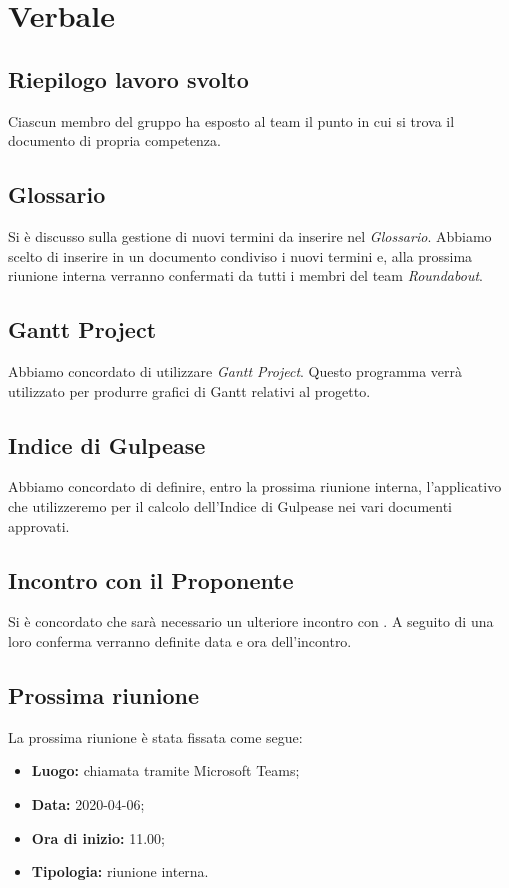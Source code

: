 \section{Verbale}
	
	\subsection{Riepilogo lavoro svolto}
		Ciascun membro del gruppo ha esposto al team il punto in cui si trova il documento di propria competenza.

	\subsection{Glossario}
		Si è discusso sulla gestione di nuovi termini da inserire nel \textit{Glossario}. Abbiamo scelto di inserire in un documento condiviso i nuovi termini e, alla prossima riunione interna verranno confermati da tutti i membri del team \textit{Roundabout}.

	\subsection{Gantt Project}
		Abbiamo concordato di utilizzare \textit{Gantt Project}. Questo programma verrà utilizzato per produrre grafici di Gantt relativi al progetto.
		
	\subsection{Indice di Gulpease}
		Abbiamo concordato di definire, entro la prossima riunione interna, l'applicativo che utilizzeremo per il calcolo dell'Indice di Gulpease nei vari documenti approvati.
		
	\subsection{Incontro con il Proponente}
		Si è concordato che sarà necessario un ulteriore incontro con \Proponente{}. A seguito di una loro conferma verranno definite data e ora dell'incontro.

	\subsection{Prossima riunione}
		La prossima riunione è stata fissata come segue: 
		\begin{itemize}
			\item \textbf{Luogo: } chiamata tramite Microsoft Teams; 
			\item \textbf{Data: } 2020-04-06; 
			\item \textbf{Ora di inizio: } 11.00;
			\item \textbf{Tipologia: } riunione interna.
		\end{itemize}